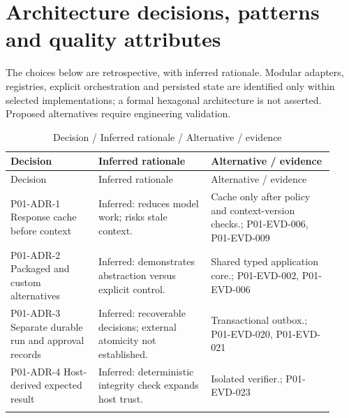 \documentclass[10pt,letterpaper]{article}
\begin{document}
\section{Architecture decisions, patterns and quality attributes}
The choices below are retrospective, with inferred rationale. Modular adapters, registries, explicit orchestration and persisted state are identified only within selected implementations; a formal hexagonal architecture is not asserted. Proposed alternatives require engineering validation.
\begin{longtable}{@{}>{\raggedright\arraybackslash}p{0.25\linewidth}>{\raggedright\arraybackslash}p{0.32\linewidth}>{\raggedright\arraybackslash}p{0.35\linewidth}@{}}
\caption{Decision / Inferred rationale / Alternative / evidence}\\
\toprule Decision & Inferred rationale & Alternative / evidence\\\midrule\endfirsthead
\toprule Decision & Inferred rationale & Alternative / evidence\\\midrule\endhead
P01-ADR-1 Response cache before context & Inferred: reduces model work; risks stale context. & Cache only after policy and context-version checks.; P01-EVD-006, P01-EVD-009\\\addlinespace
P01-ADR-2 Packaged and custom alternatives & Inferred: demonstrates abstraction versus explicit control. & Shared typed application core.; P01-EVD-002, P01-EVD-006\\\addlinespace
P01-ADR-3 Separate durable run and approval records & Inferred: recoverable decisions; external atomicity not established. & Transactional outbox.; P01-EVD-020, P01-EVD-021\\\addlinespace
P01-ADR-4 Host-derived expected result & Inferred: deterministic integrity check expands host trust. & Isolated verifier.; P01-EVD-023\\\addlinespace
\bottomrule\end{longtable}
\end{document}

